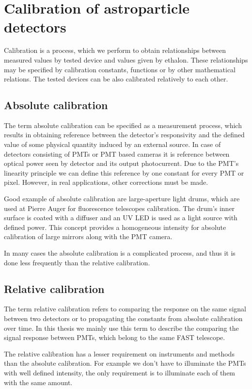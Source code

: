 
\chapter{Calibration of astroparticle detectors}
Calibration is a process, which we perform to obtain relationships between measured values by tested device and values given by ethalon. These relationships may be specified by calibration constants, functions or by other mathematical relations. The tested devices can be also calibrated relatively to each other.
\par
\section{Absolute calibration}
The term absolute calibration can be specified as a measurement process, which results in obtaining reference between the detector's responsivity and the defined value of some physical quantity induced by an external source. In case of detectors consisting of PMTs or PMT based cameras it is reference between optical power seen by detector and its output photocurrent. Due to the PMT's linearity principle we can define this reference by one constant for every PMT or pixel. However, in real applications, other corrections must be made.

\par
Good example of absolute calibration are large-aperture light drums, which are used at Pierre Auger for fluorescence telescopes calibration. The drum's inner surface is coated with a diffuser and an UV LED is used as a light source with defined power. This concept provides a homogeneous intensity for absolute calibration of large mirrors along with the PMT camera. 

\par
In many cases the absolute calibration is a complicated process, and thus it is done less frequently than the relative calibration.

\section{Relative calibration}
The term relative calibration refers to comparing the response on the same signal between two detectors or to propagating the constants from absolute calibration over time.
In this thesis we mainly use this term to describe the comparing the signal response between PMTs, which belong to the same FAST telescope. 
\par
The relative calibration has a lesser requirement on instruments and methods than the absolute calibration. For example we don't have to illuminate the PMTs with well defined intensity, the only requirement is to illuminate each of them with the same amount. 


